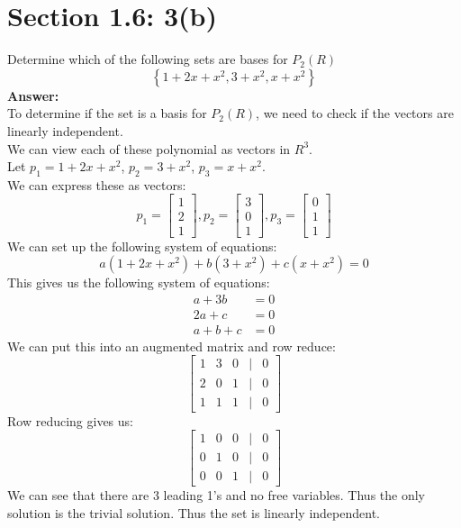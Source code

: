 \documentclass{article}
\begin{document}
\section*{Section 1.6: 3(b)}
Determine which of the following sets are bases for $P_2(R)$
$$ \left\{ 1+2x+x^2,3+x^2, x+x^2 \right\}$$
\textbf{Answer:} \\
To determine if the set is a basis for $P_2(R)$, we need to check if the vectors are linearly independent.\\
We can view each of these polynomial as vectors in $R^3$.\\
Let $p_1 = 1 + 2x + x^2$, $p_2 = 3 + x^2$, $p_3 = x + x^2$.\\
We can express these as vectors:
$$ p_1 = \begin{bmatrix}
    1 \\
    2 \\
    1
\end{bmatrix}, p_2 = \begin{bmatrix}
    3 \\
    0 \\
    1
\end{bmatrix}, p_3 = \begin{bmatrix}
    0 \\
    1 \\
    1
\end{bmatrix}$$
We can set up the following system of equations:
$$ a(1 + 2x + x^2) + b(3 + x^2) + c(x + x^2) = 0$$
This gives us the following system of equations:
\begin{align*}
    a + 3b &= 0 \\
    2a + c &= 0 \\
    a + b + c &= 0
\end{align*}
We can put this into an augmented matrix and row reduce:
$$ \begin{bmatrix}
    1 & 3 & 0 & | & 0 \\
    2 & 0 & 1 & | & 0 \\
    1 & 1 & 1 & | & 0
\end{bmatrix}$$
Row reducing gives us:
$$ \begin{bmatrix}
    1 & 0 & 0 & | & 0 \\
    0 & 1 & 0 & | & 0 \\
    0 & 0 & 1 & | & 0
\end{bmatrix}$$
We can see that there are 3 leading 1's and no free variables. Thus the only solution is the trivial solution. Thus the set is linearly independent.\\
\end{document}
